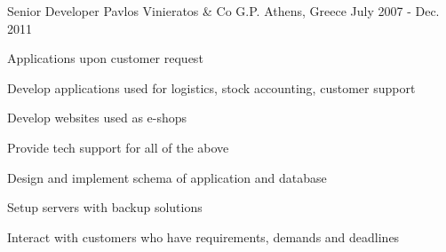 \begin{cventries}
  \cventry
    {Senior Developer} %
    {Pavlos Vinieratos \& Co G.P.} %
    {Athens, Greece} %
    {July 2007 -  Dec. 2011} %
    {
      \begin{cvitems} %
        \item {Applications upon customer request}
        \item {Develop applications used for logistics, stock accounting, customer support}
		\item {Develop websites used as e-shops}
		\item {Provide tech support for all of the above}
		\item {Design and implement schema of application and database}
		\item {Setup servers with backup solutions}
		\item {Interact with customers who have requirements, demands and deadlines}
      \end{cvitems}
    }

\end{cventries}
